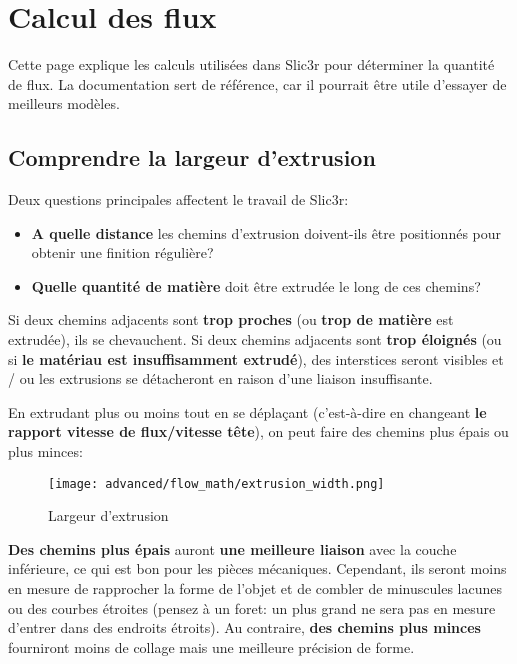
\section{Calcul des flux} %
\label{sec:flow_math}

Cette page explique les calculs utilis\'ees dans Slic3r pour d\'eterminer la quantit\'e de flux. La documentation sert de r\'ef\'erence, car il pourrait être utile d'essayer de meilleurs mod\`eles.

\subsection{Comprendre la largeur d'extrusion} %

Deux questions principales affectent le travail de Slic3r:
\begin{itemize}
\item \textbf{A quelle distance} les chemins d'extrusion doivent-ils être positionn\'es pour obtenir une finition r\'eguli\`ere?
\item \textbf{Quelle quantit\'e de mati\`ere} doit être extrud\'ee le long de ces chemins?
\end{itemize}

Si deux chemins adjacents sont \textbf{trop proches} (ou \textbf{trop de mati\`ere} est extrud\'ee), ils se chevauchent. Si deux chemins adjacents sont \textbf{trop \'eloign\'es} (ou si \textbf{le mat\'eriau est insuffisamment extrud\'e}), des interstices seront visibles et / ou les extrusions se d\'etacheront en raison d'une liaison insuffisante.

En extrudant plus ou moins tout en se d\'eplaçant (c'est-\`a-dire en changeant \textbf{le rapport vitesse de flux/vitesse tête}), on peut faire des chemins plus \'epais ou plus minces:

\begin{figure}[H]
\centering
\texttt{[image: advanced/flow\_math/extrusion\_width.png]}
\caption{Largeur d'extrusion}
\label{fig:extrusion_width}
\end{figure}

\textbf{Des chemins plus \'epais} auront \textbf{une meilleure liaison} avec la couche inf\'erieure, ce qui est bon pour les pi\`eces m\'ecaniques. Cependant, ils seront moins en mesure de rapprocher la forme de l'objet et de combler de minuscules lacunes ou des courbes \'etroites (pensez \`a un foret: un plus grand ne sera pas en mesure d'entrer dans des endroits \'etroits). Au contraire, \textbf{des chemins plus minces} fourniront moins de collage mais une meilleure pr\'ecision de forme.

